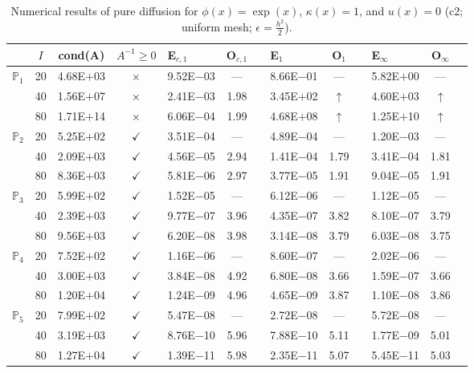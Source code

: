 \begin{table}[H]
\centering
\caption{Numerical results of pure diffusion for $\phi(x)=\exp(x)$, $\kappa(x)=1$, and $u(x)=0$ (c2; uniform mesh; $\epsilon=\frac{h^2}{2}$).}
\begin{tabular}{@{}l c c c l c c l c c l c c@{}}
\toprule
 & $I$ & cond(A) & $A^{-1}\geq 0$ &  E$_{c,1}$ & O$_{c,1}$ && E$_1$ & O$_1$ && E$_{\infty}$ & O$_{\infty}$\\
\midrule
\multirow{3}{*}{$\mathbb{P}_{1}$}
 & 20 & 4.68E$+$03 & $\times$ & 9.52E$-$03 & --- && 8.66E$-$01 & --- && 5.82E$+$00 & ---\\
 & 40 & 1.56E$+$07 & $\times$ & 2.41E$-$03 & 1.98 && 3.45E$+$02 & $\uparrow$ && 4.60E$+$03 & $\uparrow$\\
 & 80 & 1.71E$+$14 & $\times$ & 6.06E$-$04 & 1.99 && 4.68E$+$08 & $\uparrow$ && 1.25E$+$10 & $\uparrow$\\
\midrule
\multirow{3}{*}{$\mathbb{P}_{2}$}
 & 20 & 5.25E$+$02 & $\checkmark$ & 3.51E$-$04 & --- && 4.89E$-$04 & --- && 1.20E$-$03 & ---\\
 & 40 & 2.09E$+$03 & $\checkmark$ & 4.56E$-$05 & 2.94 && 1.41E$-$04 & 1.79 && 3.41E$-$04 & 1.81\\
 & 80 & 8.36E$+$03 & $\checkmark$ & 5.81E$-$06 & 2.97 && 3.77E$-$05 & 1.91 && 9.04E$-$05 & 1.91\\
\midrule
\multirow{3}{*}{$\mathbb{P}_{3}$}
 & 20 & 5.99E$+$02 & $\checkmark$ & 1.52E$-$05 & --- && 6.12E$-$06 & --- && 1.12E$-$05 & ---\\
 & 40 & 2.39E$+$03 & $\checkmark$ & 9.77E$-$07 & 3.96 && 4.35E$-$07 & 3.82 && 8.10E$-$07 & 3.79\\
 & 80 & 9.56E$+$03 & $\checkmark$ & 6.20E$-$08 & 3.98 && 3.14E$-$08 & 3.79 && 6.03E$-$08 & 3.75\\
\midrule
\multirow{3}{*}{$\mathbb{P}_{4}$}
 & 20 & 7.52E$+$02 & $\checkmark$ & 1.16E$-$06 & --- && 8.60E$-$07 & --- && 2.02E$-$06 & ---\\
 & 40 & 3.00E$+$03 & $\checkmark$ & 3.84E$-$08 & 4.92 && 6.80E$-$08 & 3.66 && 1.59E$-$07 & 3.66\\
 & 80 & 1.20E$+$04 & $\checkmark$ & 1.24E$-$09 & 4.96 && 4.65E$-$09 & 3.87 && 1.10E$-$08 & 3.86\\
\midrule
\multirow{3}{*}{$\mathbb{P}_{5}$}
 & 20 & 7.99E$+$02 & $\checkmark$ & 5.47E$-$08 & --- && 2.72E$-$08 & --- && 5.72E$-$08 & ---\\
 & 40 & 3.19E$+$03 & $\checkmark$ & 8.76E$-$10 & 5.96 && 7.88E$-$10 & 5.11 && 1.77E$-$09 & 5.01\\
 & 80 & 1.27E$+$04 & $\checkmark$ & 1.39E$-$11 & 5.98 && 2.35E$-$11 & 5.07 && 5.45E$-$11 & 5.03\\
\bottomrule
\end{tabular}
\end{table}